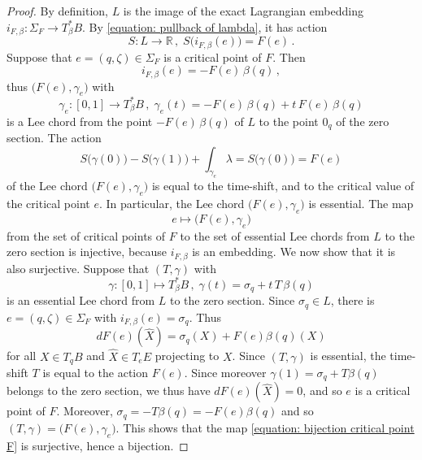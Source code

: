 \documentclass{amsart}
\theoremstyle{remark}
\begin{document}
\begin{proof}
By definition,
$L$ is the image of the exact Lagrangian embedding
$i_{F, \beta}: \Sigma_F \rightarrow T^{\ast}_{\beta}B$.
By \eqref{equation: pullback of lambda},
it has action
\[
S: L \rightarrow \mathbb{R} \,,\;
S \big( i_{F, \beta} (e) \big) = F (e) \,.
\]
Suppose that $e = (q, \zeta) \in \Sigma_F$ is a critical point of $F$.
Then
\[
i_{F, \beta} (e) = - F(e) \, \beta (q) \,,
\]
thus $\big( F(e), \gamma_e \big)$ with
\[
\gamma_e: [0, 1] \rightarrow T_{\beta}^{\ast}B \,,\;
\gamma_e(t) = - F(e) \, \beta (q) + t \, F(e) \, \beta (q)
\]
is a Lee chord from the point $- F(e) \, \beta (q)$ of $L$
to the point $0_q$ of the zero section.
The action
\[
S \big(\gamma(0)\big) - S \big(\gamma(1)\big) + \int_{\gamma_e} \lambda
= S \big(\gamma(0)\big) = F(e)
\]
of the Lee chord $\big( F(e), \gamma_e \big)$
is equal to the time-shift,
and to the critical value of the critical point $e$.
In particular,
the Lee chord $\big( F(e), \gamma_e \big)$ is essential.
The map
\begin{equation}\label{equation: bijection critical point F}
e \mapsto \big( F(e), \gamma_e \big)    
\end{equation}
from the set of critical points of $F$
to the set of essential Lee chords
from $L$ to the zero section
is injective,
because $i_{F, \beta}$ is an embedding.
We now show that it is also surjective.
Suppose that $(T, \gamma)$ with
\[
\gamma: [0, 1] \mapsto T_{\beta}^{\ast}B \,,\;
\gamma (t) = \sigma_q + t \, T \, \beta (q)
\]
is an essential Lee chord from $L$ to the zero section.
Since $\sigma_q \in L$,
there is $e = (q, \zeta) \in \Sigma_F$
with $i_{F, \beta} (e) = \sigma_q$.
Thus
\[
dF (e) (\hat{X})
= \sigma_q (X) + F(e) \beta(q) (X)
\]
for all $X \in T_qB$ and $\hat{X} \in T_eE$ projecting to $X$.
Since $(T, \gamma)$ is essential,
the time-shift $T$
is equal to the action $F(e)$.
Since moreover $\gamma(1) = \sigma_q + T \beta(q)$ belongs to the zero section,
we thus have $dF(e) (\hat{X}) = 0$,
and so $e$ is a critical point of $F$.
Moreover, $\sigma_q = - T \beta(q) = - F(e) \beta(q)$
and so $(T, \gamma) = \big( F(e), \gamma_e \big)$.
This shows that the map \eqref{equation: bijection critical point F}
is surjective,
hence a bijection.


\end{proof}
\end{document}
